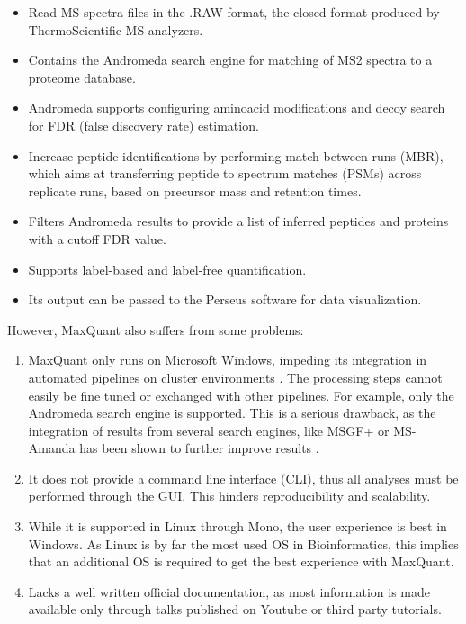 \documentclass[11pt, a4paper]{report}
\begin{document}
\begin{itemize}

\item Read MS spectra files in the .RAW format, the closed format produced by ThermoScientific MS analyzers.

\item Contains the Andromeda search engine \cite{Cox2011} for matching of \ac{MS2} spectra to a proteome database.

\item Andromeda supports configuring aminoacid modifications and decoy search for FDR (false discovery rate) estimation.

\item Increase peptide identifications by performing match between runs (MBR), which aims at transferring peptide to spectrum matches (PSMs) across replicate runs, based on precursor mass and retention times.

\item Filters Andromeda results to provide a list of inferred peptides and proteins with a cutoff FDR value.

\item Supports label-based and label-free quantification.

\item Its output can be passed to the Perseus software for data visualization. %

\end{itemize}

However, MaxQuant also suffers from some problems:

\begin{enumerate}

\item MaxQuant only runs on Microsoft Windows, impeding its integration in automated pipelines on cluster environments \cite{Argentini2016}. The processing steps cannot easily be fine tuned or exchanged with other pipelines. For example, only the Andromeda search engine is supported. This is a serious drawback, as the integration of results from several search engines, like MSGF+ \cite{Kim2014} or MS-Amanda \cite{Dorfer2014}  has been shown to further improve results \cite{Shteynberg2013}.

\item It does not provide a command line interface (CLI), thus all analyses must be performed through the GUI. This hinders reproducibility and scalability.

\item While it is supported in Linux through Mono, the user experience is best in Windows. As Linux is by far the most used OS in Bioinformatics, this implies that an additional OS is required to get the best experience with MaxQuant.

\item Lacks a well written official documentation, as most information is made available only through talks published on Youtube or third party tutorials.

\end{enumerate}
\end{document}
